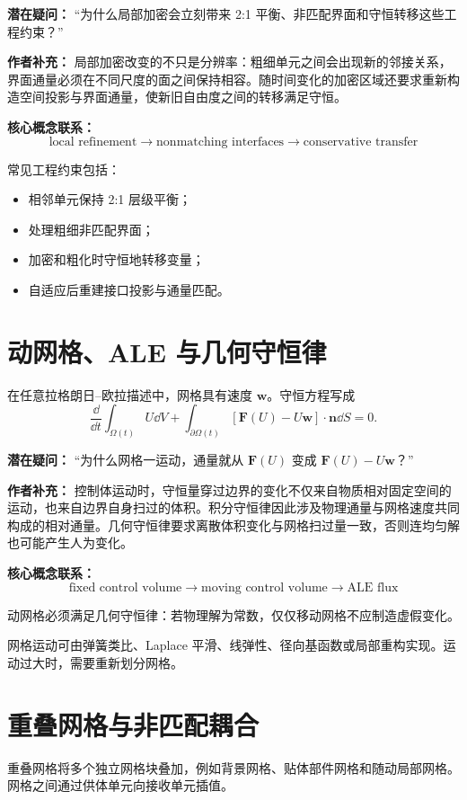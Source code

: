 \begin{authornote}
\textbf{潜在疑问：}
“为什么局部加密会立刻带来 2:1 平衡、非匹配界面和守恒转移这些工程约束？”

\textbf{作者补充：}
局部加密改变的不只是分辨率：粗细单元之间会出现新的邻接关系，界面通量必须在不同尺度的面之间保持相容。随时间变化的加密区域还要求重新构造空间投影与界面通量，使新旧自由度之间的转移满足守恒。

\textbf{核心概念联系：}
\[
\text{local refinement}
\longrightarrow
\text{nonmatching interfaces}
\longrightarrow
\text{conservative transfer}
\]
\end{authornote}

常见工程约束包括：
\begin{itemize}
  \item 相邻单元保持 2:1 层级平衡；
  \item 处理粗细非匹配界面；
  \item 加密和粗化时守恒地转移变量；
  \item 自适应后重建接口投影与通量匹配。
\end{itemize}

\section{动网格、ALE 与几何守恒律}
在任意拉格朗日--欧拉描述中，网格具有速度 \(\bm w\)。守恒方程写成
\[
\frac{\dd}{\dd t}\int_{\Omega(t)}U\dd V
+
\int_{\partial\Omega(t)}
[\bm F(U)-U\bm w]\cdot\bm n\dd S
=0.
\]

\begin{authornote}
\textbf{潜在疑问：}
“为什么网格一运动，通量就从 \(\bm F(U)\) 变成 \(\bm F(U)-U\bm w\)？”

\textbf{作者补充：}
控制体运动时，守恒量穿过边界的变化不仅来自物质相对固定空间的运动，也来自边界自身扫过的体积。积分守恒律因此涉及物理通量与网格速度共同构成的相对通量。几何守恒律要求离散体积变化与网格扫过量一致，否则连均匀解也可能产生人为变化。

\textbf{核心概念联系：}
\[
\text{fixed control volume}
\longrightarrow
\text{moving control volume}
\longrightarrow
\text{ALE flux}
\]
\end{authornote}

动网格必须满足几何守恒律：若物理解为常数，仅仅移动网格不应制造虚假变化。

网格运动可由弹簧类比、Laplace 平滑、线弹性、径向基函数或局部重构实现。运动过大时，需要重新划分网格。

\section{重叠网格与非匹配耦合}
重叠网格将多个独立网格块叠加，例如背景网格、贴体部件网格和随动局部网格。网格之间通过供体单元向接收单元插值。

